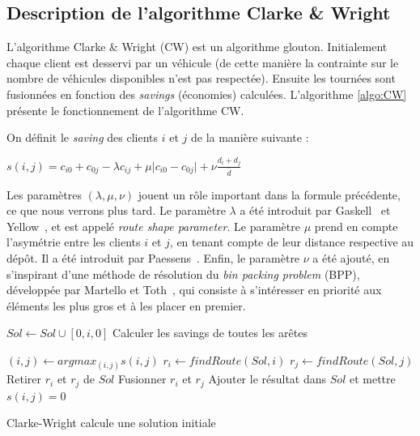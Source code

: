 \documentclass[a4paper,11pt]{article}%
\begin{document}
\subsection{Description de l'algorithme Clarke \& Wright}
L'algorithme Clarke \& Wright (CW) est un algorithme glouton. 
Initialement chaque client est desservi par un véhicule (de cette manière la contrainte sur le nombre de véhicules disponibles n'est pas respectée). Ensuite les tournées sont fusionnées en fonction des \emph{savings} (économies) calculées. L'algorithme \ref{algo:CW} présente le fonctionnement de l'algorithme CW.

On définit le \emph{saving} des clients $i$ et $j$ de la manière suivante :

\begin{center}
$s(i,j) = c_{i0} + c_{0j} - \lambda c_{ij} + \mu \vert c_{i0} - c_{0j} \vert + \nu \frac{d_i + d_j}{\overline{d}}$
\end{center}

Les paramètres $(\lambda, \mu, \nu)$ jouent un rôle important dans la formule précédente, ce que nous verrons plus tard. Le paramètre $\lambda$ a été introduit par Gaskell~\cite{Gaskell} et Yellow~\cite{Yellow}, et est appelé \emph{route shape parameter}. Le paramètre $\mu$ prend en compte l'asymétrie entre les clients $i$ et $j$, en tenant compte de leur distance respective au dépôt. Il a été introduit par Paessens~\cite{Paessens}. Enfin, le paramètre $\nu$ a été ajouté, en s'inspirant d'une méthode de résolution du \emph{bin packing problem} (BPP), développée par Martello et Toth~\cite{Martello}, qui consiste à s'intéresser en priorité aux éléments les plus gros et à les placer en premier. 


\begin{algorithm}
\DontPrintSemicolon %

 {
	$Sol \gets Sol \cup [0,i,0]$\;
}
Calculer les savings de toutes les arêtes\;

 {
	$(i,j) \gets argmax_{(i,j)} s(i,j)$\;
	$r_i \gets findRoute(Sol,i)$\;
	$r_j \gets findRoute(Sol,j)$\;
	 {
		Retirer $r_i$ et $r_j$ de $Sol$\;
		Fusionner $r_i$ et $r_j$\;
		Ajouter le résultat dans $Sol$ et mettre $s(i,j) = 0$\;
	}
}

\;
\caption{{\sc Clarke-Wright} calcule une solution initiale}
\label{algo:CW}
\end{algorithm}
\end{document}

